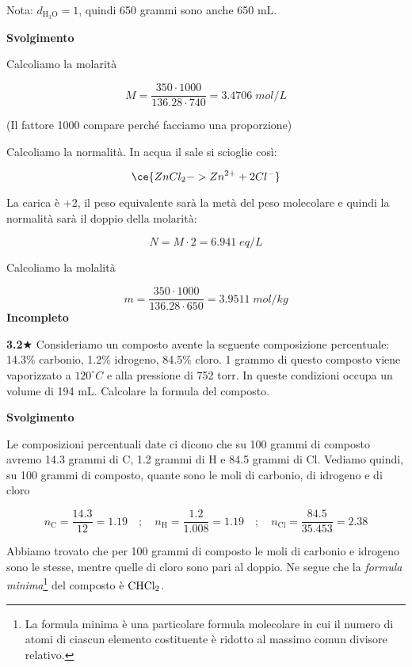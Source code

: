 \vspace{0.2cm}Nota: $d_{\text{H}_3\text{O}}=1$, quindi 650 grammi sono anche 650 mL.

\vspace{0.2cm}\large\textbf{Svolgimento}\normalsize

\vspace{0.2cm}Calcoliamo la molarità

$$M=\frac{350 \cdot 1000}{136.28 \cdot 740}=3.4706\;mol/L$$

(Il fattore 1000 compare perché facciamo una proporzione)

Calcoliamo la normalità. In acqua il sale si scioglie così:

$$\ce{ZnCl_2 -> Zn^{2+} + 2Cl^-}$$

La carica è +2, il peso equivalente sarà la metà del peso molecolare e quindi la normalità sarà il doppio della molarità:

$$N=M \cdot 2=6.941\;eq/L$$

Calcoliamo la molalità

$$m=\frac{350 \cdot 1000}{136.28 \cdot 650}=3.9511\;mol/kg$$
\textbf{Incompleto}

\vspace{0.2cm}\textbf{3.2}$\bigstar$ Consideriamo un composto avente la seguente composizione percentuale: 14.3\% carbonio, 1.2\% idrogeno, 84.5\% cloro. 1 grammo di questo composto viene vaporizzato a $120^{\circ}C$ e alla pressione di 752 torr. In queste condizioni occupa un volume di 194 mL. Calcolare la formula del composto.

\vspace{0.2cm}\large\textbf{Svolgimento}\normalsize

\vspace{0.2cm}Le composizioni percentuali date ci dicono che su 100 grammi di composto avremo 14.3 grammi di C, 1.2 grammi di H e 84.5 grammi di Cl. Vediamo quindi, su 100 grammi di composto, quante sono le moli di carbonio, di idrogeno e di cloro

$$n_{\text{C}}=\frac{14.3}{12}=1.19
\quad;\quad
n_{\text{H}}=\frac{1.2}{1.008}=1.19
\quad;\quad
n_{\text{Cl}}=\frac{84.5}{35.453}=2.38$$

Abbiamo trovato che per 100 grammi di composto le moli di carbonio e idrogeno sono le stesse, mentre quelle di cloro sono pari al doppio. Ne segue che la \textit{formula minima}\footnote{La formula minima è una particolare formula molecolare in cui il numero di atomi di ciascun elemento costituente è ridotto al massimo comun divisore relativo.} del composto è $\rm CHCl_2$.


